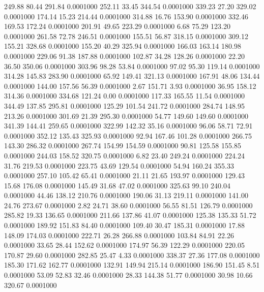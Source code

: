  249.88   80.44  291.84   0.0001000
 252.11   33.45  344.54   0.0001000
 339.23   27.20  329.02   0.0001000
 174.14   15.23  214.44   0.0001000
 314.88   16.76  153.90   0.0001000
 332.46  169.53  172.24   0.0001000
 201.91   49.65  223.29   0.0001000
   6.68   75.29  123.20   0.0001000
 261.58   72.78  246.51   0.0001000
 155.51   56.87  318.15   0.0001000
 309.12  155.21  328.68   0.0001000
 155.20   40.29  325.94   0.0001000
 166.03  163.14  180.98   0.0001000
 229.06   91.38  187.88   0.0001000
 102.87   34.28  128.26   0.0001000
  22.20   36.50  350.06   0.0001000
 303.96   98.28   53.84   0.0001000
  97.02   95.30  119.14   0.0001000
 314.28  145.83  283.90   0.0001000
  65.92  149.41  321.13   0.0001000
 167.91   48.06  134.44   0.0001000
 144.00  157.56   56.39   0.0001000
   2.67  151.71    3.93   0.0001000
  36.95  158.12  314.36   0.0001000
 334.68  121.24    0.00   0.0001000
 117.33  165.55   11.54   0.0001000
 344.49  137.85  295.81   0.0001000
 125.29  101.54  241.72   0.0001000
 284.74  148.95  213.26   0.0001000
 301.69   21.39  295.30   0.0001000
  54.77  149.60  149.60   0.0001000
 341.39  144.41  259.65   0.0001000
 322.99  142.32   35.16   0.0001000
  96.06   58.71   72.91   0.0001000
 352.12  135.43  325.93   0.0001000
  92.94  167.46  101.28   0.0001000
 266.75  143.30  286.32   0.0001000
 267.74  154.99  154.59   0.0001000
  90.81  125.58  155.85   0.0001000
 244.03  158.52  320.75   0.0001000
   6.82   23.40  249.24   0.0001000
 224.24   31.76  219.53   0.0001000
 223.75   43.69  129.54   0.0001000
  54.94  160.24  355.33   0.0001000
 257.10  105.42   65.41   0.0001000
  21.11   21.65  193.97   0.0001000
 129.43   15.68  176.08   0.0001000
 145.49   31.68   47.02   0.0001000
 325.63   99.10  240.04   0.0001000
  44.46  138.12  210.76   0.0001000
 190.06   31.13  219.11   0.0001000
 141.00   24.76  273.67   0.0001000
   2.82   24.71   38.60   0.0001000
  56.55   81.51  126.79   0.0001000
 285.82   19.33  136.65   0.0001000
 211.66  137.86   41.07   0.0001000
 125.38  135.33   51.72   0.0001000
 189.92  151.83   84.40   0.0001000
 109.40   30.47  185.31   0.0001000
  17.88  148.09  174.03   0.0001000
 222.71   26.28  266.88   0.0001000
 103.84   84.91   22.26   0.0001000
  33.65   28.44  152.62   0.0001000
 174.97   56.39  122.29   0.0001000
 220.05  170.87   29.60   0.0001000
 282.85   25.47    4.33   0.0001000
 338.37   27.36  177.08   0.0001000
 185.30  171.62  162.77   0.0001000
 132.91  149.94  215.14   0.0001000
 186.90  151.45    8.51   0.0001000
  53.09   52.83   32.46   0.0001000
  28.33  144.38   51.77   0.0001000
  30.98   10.66  320.67   0.0001000
